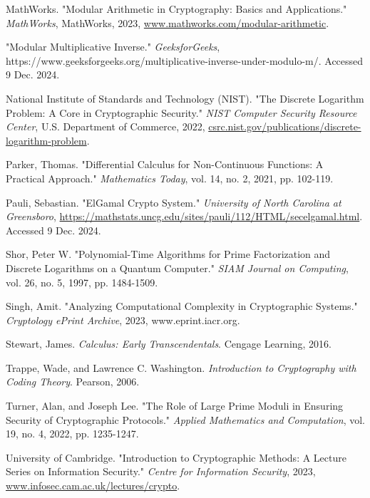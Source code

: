 \documentclass[12pt]{article}
\begin{document}
\begin{thebibliography}{9}
MathWorks. "Modular Arithmetic in Cryptography: Basics and Applications." \textit{MathWorks}, MathWorks, 2023, \url{www.mathworks.com/modular-arithmetic}.

"Modular Multiplicative Inverse." \textit{GeeksforGeeks}, https://www.geeksforgeeks.org/multiplicative-inverse-under-modulo-m/. Accessed 9 Dec. 2024.

National Institute of Standards and Technology (NIST). "The Discrete Logarithm Problem: A Core in Cryptographic Security." \textit{NIST Computer Security Resource Center}, U.S. Department of Commerce, 2022, \url{csrc.nist.gov/publications/discrete-logarithm-problem}.

Parker, Thomas. "Differential Calculus for Non-Continuous Functions: A Practical Approach." \textit{Mathematics Today}, vol. 14, no. 2, 2021, pp. 102-119.

Pauli, Sebastian. "ElGamal Crypto System." \textit{University of North Carolina at Greensboro}, \url{https://mathstats.uncg.edu/sites/pauli/112/HTML/secelgamal.html}. Accessed 9 Dec. 2024.

Shor, Peter W. "Polynomial-Time Algorithms for Prime Factorization and Discrete Logarithms on a Quantum Computer." \textit{SIAM Journal on Computing}, vol. 26, no. 5, 1997, pp. 1484-1509.

Singh, Amit. "Analyzing Computational Complexity in Cryptographic Systems." \textit{Cryptology ePrint Archive}, 2023, www.eprint.iacr.org.

Stewart, James. \textit{Calculus: Early Transcendentals}. Cengage Learning, 2016.

Trappe, Wade, and Lawrence C. Washington. \textit{Introduction to Cryptography with Coding Theory}. Pearson, 2006.

Turner, Alan, and Joseph Lee. "The Role of Large Prime Moduli in Ensuring Security of Cryptographic Protocols." \textit{Applied Mathematics and Computation}, vol. 19, no. 4, 2022, pp. 1235-1247.

University of Cambridge. "Introduction to Cryptographic Methods: A Lecture Series on Information Security." \textit{Centre for Information Security}, 2023, \url{www.infosec.cam.ac.uk/lectures/crypto}.

\end{thebibliography}
\end{document}
